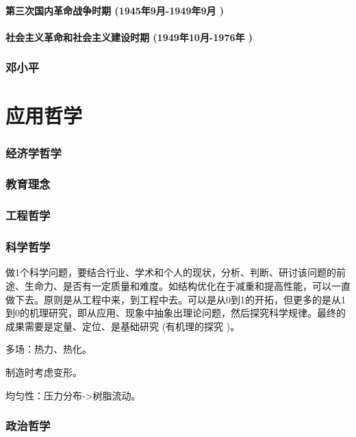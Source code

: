 \documentclass[UTF8]{../RepresentationUniverse}
\begin{document}
    \subsubsection{第三次国内革命战争时期 (1945年9月-1949年9月 )}
    \subsubsection{社会主义革命和社会主义建设时期 (1949年10月-1976年 )}



\subsection{邓小平}







\chapter{应用哲学}
    \subsection{经济学哲学}
    \subsection{教育理念}
    \subsection{工程哲学}
    \subsection{科学哲学}

    做1个科学问题，要结合行业、学术和个人的现状，分析、判断、研讨该问题的前途、生命力、是否有一定质量和难度。如结构优化在于减重和提高性能，可以一直做下去。原则是从工程中来，到工程中去。可以是从0到1的开拓，但更多的是从1到0的机理研究，即从应用、现象中抽象出理论问题，然后探究科学规律。最终的成果需要是定量、定位、是基础研究 (有机理的探究 )。

    多场：热力、热化。

    制造时考虑变形。

    均匀性：压力分布->树脂流动。




    \subsection{政治哲学}
\end{document}
